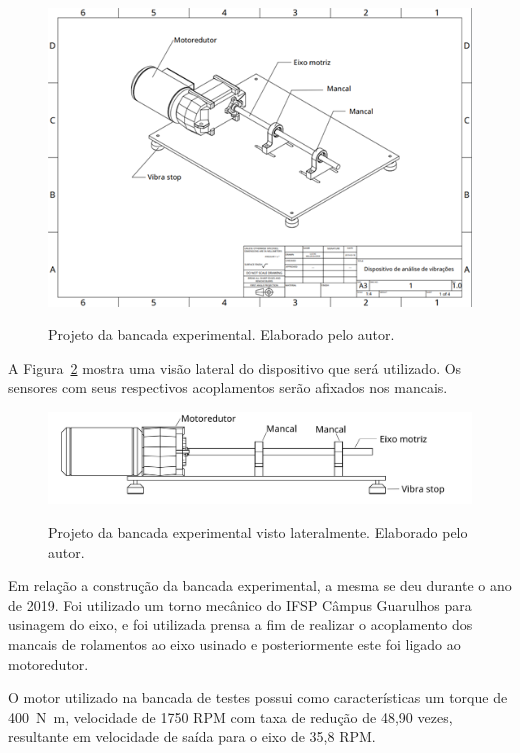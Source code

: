 \documentclass[
	12pt,				
	oneside,			
	a4paper,			
	english,			
	brazil,			
	]{abntex2ppgsi}
\begin{document}
\begin{figure}[H]
\centering
\caption {Projeto da bancada experimental. Elaborado pelo autor.}
\includegraphics[width=\textwidth,height=\textheight,keepaspectratio]{Figura22}
\label{Figura22}
\end{figure}

A Figura~\ref{dispositivo_teste_visto_de_lado} mostra uma visão lateral do dispositivo que será utilizado. Os sensores com seus respectivos acoplamentos serão afixados nos mancais. 

\begin{figure}[H]
\centering
\caption {Projeto da bancada experimental visto lateralmente. Elaborado pelo autor.}
\includegraphics[width=\textwidth,height=\textheight,keepaspectratio]{dispositivo_teste_visto_de_lado}
\label{dispositivo_teste_visto_de_lado}
\end{figure}

Em relação a construção da bancada experimental, a mesma se deu durante o ano de 2019. Foi utilizado um torno mecânico do IFSP Câmpus Guarulhos para usinagem do eixo, e foi utilizada prensa a fim de realizar o acoplamento dos mancais de rolamentos ao eixo usinado e posteriormente este foi ligado ao motoredutor. 

O motor utilizado na bancada de testes possui como características um torque de \SI{400}{\newton\metre}, velocidade de 1750 RPM com taxa de redução de 48,90 vezes, resultante em velocidade de saída para o eixo de 35,8 RPM.  
\end{document}
